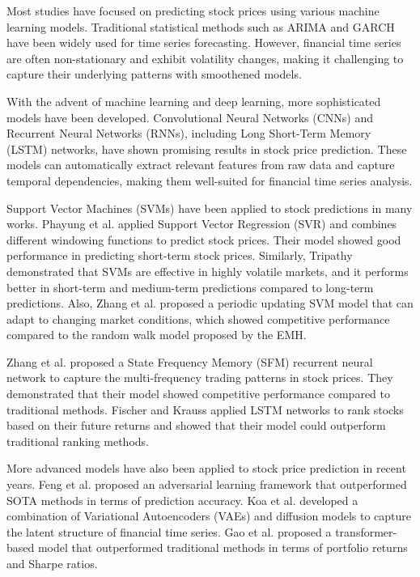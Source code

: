 \documentclass[conference]{IEEEtran}
\begin{document}
Most studies have focused on predicting stock prices using various machine learning models. Traditional statistical methods such as ARIMA and GARCH have been widely used for time series forecasting. However, financial time series are often non-stationary and exhibit volatility changes, making it challenging to capture their underlying patterns with smoothened models.

With the advent of machine learning and deep learning, more sophisticated models have been developed. Convolutional Neural Networks (CNNs) and Recurrent Neural Networks (RNNs), including Long Short-Term Memory (LSTM) networks, have shown promising results in stock price prediction. These models can automatically extract relevant features from raw data and capture temporal dependencies, making them well-suited for financial time series analysis.

Support Vector Machines (SVMs) have been applied to stock predictions in many works. Phayung et al. \cite{phayung2013} applied Support Vector Regression (SVR) and combines different windowing functions to predict stock prices. Their model showed good performance in predicting short-term stock prices. Similarly, Tripathy \cite{tripathy2019} demonstrated that SVMs are effective in highly volatile markets, and it performs better in short-term and medium-term predictions compared to long-term predictions. Also, Zhang et al. \cite{zhang2017} proposed a periodic updating SVM model that can adapt to changing market conditions, which showed competitive performance compared to the random walk model proposed by the EMH.

Zhang et al. \cite{zhang2017} proposed a State Frequency Memory (SFM) recurrent neural network to capture the multi-frequency trading patterns in stock prices. They demonstrated that their model showed competitive performance compared to traditional methods. Fischer and Krauss \cite{fischer2018} applied LSTM networks to rank stocks based on their future returns and showed that their model could outperform traditional ranking methods.

More advanced models have also been applied to stock price prediction in recent years. Feng et al. \cite{feng2019an} proposed an adversarial learning framework that outperformed SOTA methods in terms of prediction accuracy. Koa et al. \cite{koa2023} developed a combination of Variational Autoencoders (VAEs) and diffusion models to capture the latent structure of financial time series. Gao et al. \cite{gao2023} proposed a transformer-based model that outperformed traditional methods in terms of portfolio returns and Sharpe ratios.
\end{document}
